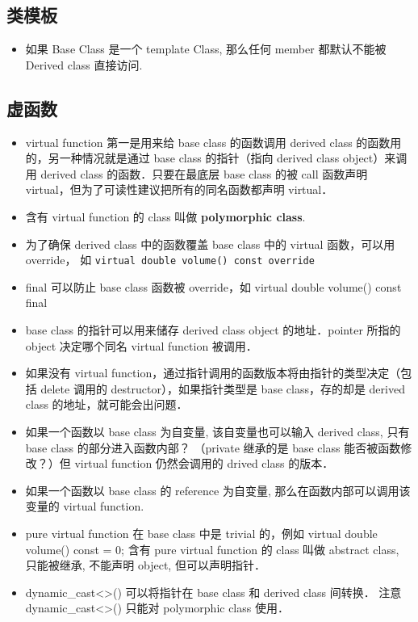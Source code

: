 \subsection{类模板}
\begin{itemize}
\item 如果 Base Class 是一个 template Class, 那么任何 member 都默认不能被 Derived class 直接访问.
\end{itemize}


\subsection{虚函数}
\begin{itemize}
\item virtual function 第一是用来给 base class 的函数调用 derived class 的函数用的，另一种情况就是通过 base class 的指针（指向 derived class object）来调用 derived class 的函数．只要在最底层 base class 的被 call 函数声明 virtual，但为了可读性建议把所有的同名函数都声明 virtual．
\item 含有 virtual function 的 class 叫做 \textbf{polymorphic class}.
\item 为了确保 derived class 中的函数覆盖 base class 中的 virtual 函数，可以用 override， 如 \verb|virtual double volume() const override|
\item final 可以防止 base class 函数被 override，如 virtual double volume() const final
\item base class 的指针可以用来储存 derived class object 的地址．pointer 所指的 object 决定哪个同名 virtual function 被调用．
\item 如果没有 virtual function，通过指针调用的函数版本将由指针的类型决定（包括 delete 调用的 destructor），如果指针类型是 base class，存的却是 derived class 的地址，就可能会出问题．
\item 如果一个函数以 base class 为自变量, 该自变量也可以输入 derived class, 只有 base class 的部分进入函数内部？ （private 继承的是 base class 能否被函数修改？）但 virtual function 仍然会调用的 drived class 的版本．
\item 如果一个函数以 base class 的 reference 为自变量, 那么在函数内部可以调用该变量的 virtual function.
\item pure virtual function 在 base class 中是 trivial 的，例如 virtual double volume() const = 0; 含有 pure virtual function 的 class 叫做 abstract class, 只能被继承, 不能声明 object, 但可以声明指针．
\item dynamic_cast<>() 可以将指针在 base class 和 derived class 间转换． 注意 dynamic_cast<>() 只能对 polymorphic class 使用．

\end{itemize}
